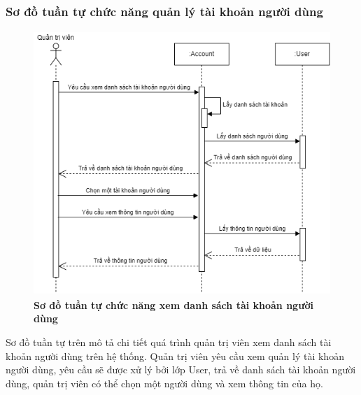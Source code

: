\subsubsection{Sơ đồ tuần tự chức năng quản lý tài khoản người dùng}
\begin{figure}[H]
  \centering
  \includegraphics[width=11.5cm,height=10cm]{Images/sequence/sequence_manage_user.png}
  \caption[Sơ đồ tuần tự chức năng xem danh sách tài khoản người dùng]{\bfseries \fontsize{12pt}{0pt}
  \selectfont Sơ đồ tuần tự chức năng xem danh sách tài khoản người dùng}
  \label{sequence_manage_user} %
\end{figure}
Sơ đồ tuần tự trên mô tả chi tiết quá trình quản trị viên xem danh sách tài khoản người dùng trên hệ thống. Quản trị viên yêu cầu xem
quản lý tài khoản người dùng, yêu cầu sẽ được xử lý bởi lớp User, trả về danh sách tài khoản người dùng, quản trị viên có thể chọn một người dùng và xem thông tin của họ. 
